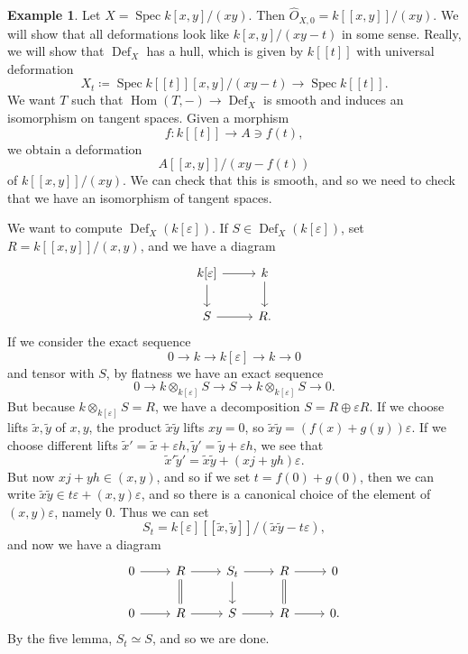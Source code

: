 \documentclass[leqno, openany]{memoir}
\theoremstyle{definition}
\newtheorem{exm}[thm]{Example}
\theoremstyle{remark}
\theoremstyle{plain}
\theoremstyle{definition}
\theoremstyle{remark}
\newcommand{\ep}{\varepsilon}
\newcommand{\wt}[1]{\widetilde{#1}}
\newcommand{\wh}[1]{\widehat{#1}}
\DeclareMathOperator{\Def}{Def}
\DeclareMathOperator{\Hom}{Hom}
\DeclareMathOperator{\Spec}{Spec}
\begin{document}
\begin{exm}
    Let $X = \Spec k[x,y]/(xy)$. Then $\wh{O}_{X,0} = k[[x,y]] / (xy)$. We will show that all deformations look like $k[x,y] / (xy-t)$ in some sense. Really, we will show that $\Def_X$ has a hull, which is given by $k[[t]]$ with universal deformation
    \[ X_t \coloneqq \Spec k[[t]] [x,y] / (xy-t) \to \Spec k[[t]]. \]
    We want $T$ such that $\Hom(T, -) \to \Def_X$ is smooth and induces an isomorphism on tangent spaces. Given a morphism
    \[ f \colon k[[t]] \to A \ni f(t), \]
    we obtain a deformation
    \[ A[[x,y]] / (xy - f(t)) \]
    of $k[[x,y]]/(xy)$. We can check that this is smooth, and so we need to check that we have an isomorphism of tangent spaces.

    We want to compute $\Def_X(k[\ep])$. If $S \in \Def_X(k[\ep])$, set $R = k[[x,y]]/(x,y)$, and we have a diagram
    \begin{equation*}
    \begin{tikzcd}
        k[\ep] \ar{r} \ar{d} & k \ar{d} \\
        S \ar{r} & R.
    \end{tikzcd}
    \end{equation*}
    If we consider the exact sequence
    \[ 0 \to k \to k[\ep] \to k \to 0 \]
    and tensor with $S$, by flatness we have an exact sequence
    \[ 0 \to k \otimes_{k[\ep]} S \to S \to k \otimes_{k[\ep]} S \to 0. \]
    But because $k \otimes_{k[\ep]} S = R$, we have a decomposition $S = R \oplus \ep R$. If we choose lifts $\wt{x}, \wt{y}$ of $x,y$, the product $\wt{x} \wt{y}$ lifts $xy = 0$, so $\wt{x} \wt{y} = (f(x) + g(y)) \ep$. If we choose different lifts $\wt{x}' = \wt{x} + \ep h, \wt{y}' = \wt{y} + \ep h$, we see that 
    \[ \wt{x}' \wt{y}' = \wt{x} \wt{y} + (xj + yh)\ep. \]
    But now $xj+yh \in (x,y)$, and so if we set $t = f(0) + g(0)$, then we can write $\wt{x} \wt{y} \in t \ep + (x,y) \ep$, and so there is a canonical choice of the element of $(x,y) \ep$, namely $0$. Thus we can set
    \[ S_t = k[\ep][[\wt{x}, \wt{y}]] / (\wt{x} \wt{y} - t \ep), \]
    and now we have a diagram
    \begin{equation*}
    \begin{tikzcd}
        0 \ar{r} & R \ar{r} \ar[equals]{d} & S_t \ar{r} \ar{d} & R \ar{r} \ar[equals]{d} & 0 \\
        0 \ar{r} & R \ar{r} & S \ar{r} & R \ar{r} & 0.
    \end{tikzcd}
    \end{equation*}
    By the five lemma, $S_t \simeq S$, and so we are done.
\end{exm}
\end{document}
